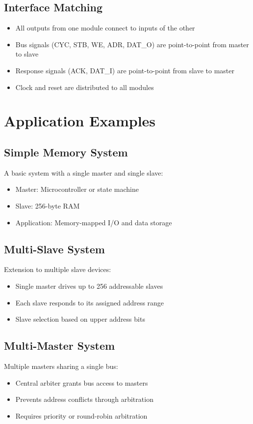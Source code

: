 \documentclass[12pt,a4paper]{article}
\begin{document}
\subsection{Interface Matching}
\begin{itemize}
    \item All outputs from one module connect to inputs of the other
    \item Bus signals (CYC, STB, WE, ADR, DAT\_O) are point-to-point from master to slave
    \item Response signals (ACK, DAT\_I) are point-to-point from slave to master
    \item Clock and reset are distributed to all modules
\end{itemize}

\section{Application Examples}

\subsection{Simple Memory System}
A basic system with a single master and single slave:
\begin{itemize}
    \item Master: Microcontroller or state machine
    \item Slave: 256-byte RAM
    \item Application: Memory-mapped I/O and data storage
\end{itemize}

\subsection{Multi-Slave System}
Extension to multiple slave devices:
\begin{itemize}
    \item Single master drives up to 256 addressable slaves
    \item Each slave responds to its assigned address range
    \item Slave selection based on upper address bits
\end{itemize}

\subsection{Multi-Master System}
Multiple masters sharing a single bus:
\begin{itemize}
    \item Central arbiter grants bus access to masters
    \item Prevents address conflicts through arbitration
    \item Requires priority or round-robin arbitration
\end{itemize}
\end{document}
